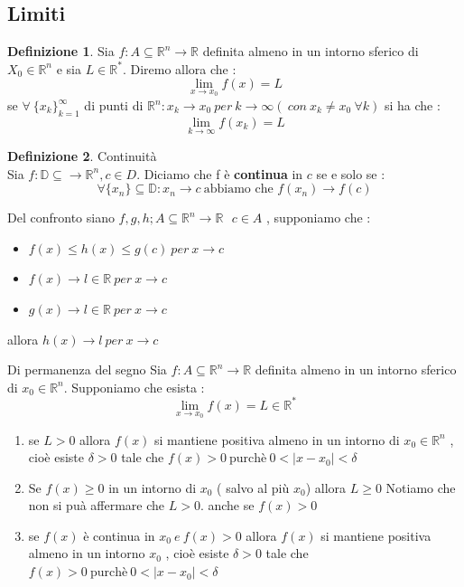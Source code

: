 \documentclass{article}
\theoremstyle{definition}
\newtheorem*{definizione}{Definizione}
\newcommand{\R}{\mathbb{R}}
\newcommand{\D}{\mathbb{D}}
\newcommand{\Rn}{\R^n}
\newcommand{\fn}{f: A\subseteq \Rn \rightarrow \R}
\begin{document}
	\subsection{Limiti}
	\begin{definizione}
		Sia $\fn$ definita almeno in un intorno sferico di $X_0\in \Rn$ e sia $ L \in \R^*$. Diremo allora che : $$\lim_{x\rightarrow x_0}f(x)=L$$
		se $\forall \ \{x_k\}_{k=1}^\infty$ di punti di $\Rn:x_k \rightarrow x_0 \ per \ k \rightarrow \infty ( \ con \ x_k \neq x_0 \ \forall k)$ si ha che : $$\lim_{k\rightarrow \infty}f(x_k)=L$$
	\end{definizione}
	\begin{definizione}
		Continuità \\
		Sia $f: \D \subseteq\to \Rn , c\in D$. Diciamo che f è \textbf{continua} in $c$ se e solo se :      
		$$\forall \{x_n\} \subseteq \D: x_n \to c \  \text{abbiamo che }f(x_n)\to f(c)$$
	\end{definizione}
	\begin{teo}{Del confronto}{}
		siano $ f,g,h ; A \subseteq \Rn \rightarrow \R \ \ \ c \in A $ , supponiamo che : \begin{itemize}
			\item $f(x) \leq h(x) \leq g(c) \ per \ x \rightarrow c$
			\item $f(x) \rightarrow l \in \R \ per \ x \rightarrow c $
			\item $g(x) \rightarrow l\in \R \ per \ x \rightarrow c$
		\end{itemize}
		allora $ h(x) \rightarrow l \ per \ x \rightarrow c $
	\end{teo}
	\begin{teo}{Di permanenza del segno}
		Sia $\fn$ definita almeno in un intorno sferico di $x_0 \in \Rn$. Supponiamo che esista : $$\lim_{x\rightarrow x_0}f(x)=L\in \R^*$$
		\begin{enumerate}
			\item se $L>0$ allora $f(x)$ si mantiene positiva almeno in un intorno di $x_0 \in \Rn$ , cioè esiste $\delta > 0 $ tale che $f(x) > 0  \ \text{purchè} \ 0<|x-x_0|<\delta$
			\item Se $f(x) \geq 0$ in un intorno di $x_0$ ( salvo al più $x_0$) allora $ L \geq 0 $ Notiamo che non si puà affermare che $L>0$. anche se $f(x) > 0$
			\item se $f(x)$ è continua in $x_0\ e \ f(x) > 0 $ allora $f(x) $ si mantiene positiva almeno in un intorno $x_0$ , cioè esiste $\delta > 0 $ tale che $f(x) > 0  \ \text{purchè} \ 0<|x-x_0|<\delta$
		\end{enumerate}
	\end{teo}
\end{document}
